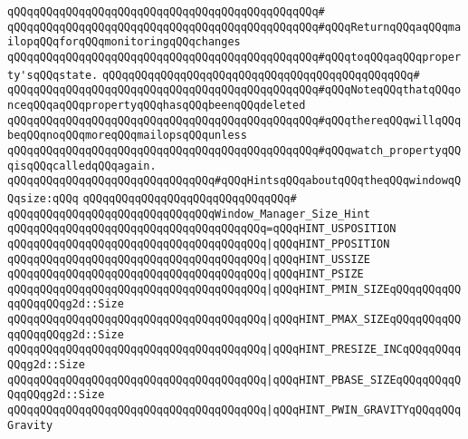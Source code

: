 \verb|qQQqqQQqqQQqqQQqqQQqqQQqqQQqqQQqqQQqqQQqqQQqqQQq#|\newline
\verb|qQQqqQQqqQQqqQQqqQQqqQQqqQQqqQQqqQQqqQQqqQQqqQQq#qQQqReturnqQQqaqQQqmailopqQQqforqQQqmonitoringqQQqchanges|\newline
\verb|qQQqqQQqqQQqqQQqqQQqqQQqqQQqqQQqqQQqqQQqqQQqqQQq#qQQqtoqQQqaqQQqproperty'sqQQqstate.|\newline
\verb|qQQqqQQqqQQqqQQqqQQqqQQqqQQqqQQqqQQqqQQqqQQqqQQq#|\newline
\verb|qQQqqQQqqQQqqQQqqQQqqQQqqQQqqQQqqQQqqQQqqQQqqQQq#qQQqNoteqQQqthatqQQqonceqQQqaqQQqpropertyqQQqhasqQQqbeenqQQqdeleted|\newline
\verb|qQQqqQQqqQQqqQQqqQQqqQQqqQQqqQQqqQQqqQQqqQQqqQQq#qQQqthereqQQqwillqQQqbeqQQqnoqQQqmoreqQQqmailopsqQQqunless|\newline
\verb|qQQqqQQqqQQqqQQqqQQqqQQqqQQqqQQqqQQqqQQqqQQqqQQq#qQQqwatch_propertyqQQqisqQQqcalledqQQqagain.|\newline
\newline
\newline
\newline
\verb|qQQqqQQqqQQqqQQqqQQqqQQqqQQqqQQq#qQQqHintsqQQqaboutqQQqtheqQQqwindowqQQqsize:qQQq|\newline
\verb|qQQqqQQqqQQqqQQqqQQqqQQqqQQqqQQq#|\newline
\verb|qQQqqQQqqQQqqQQqqQQqqQQqqQQqqQQqWindow_Manager_Size_Hint|\newline
\verb|qQQqqQQqqQQqqQQqqQQqqQQqqQQqqQQqqQQqqQQq=qQQqHINT_USPOSITION|\newline
\verb|qQQqqQQqqQQqqQQqqQQqqQQqqQQqqQQqqQQqqQQq|\verb#|qQQqHINT_PPOSITION#\newline
\verb|qQQqqQQqqQQqqQQqqQQqqQQqqQQqqQQqqQQqqQQq|\verb#|qQQqHINT_USSIZE#\newline
\verb|qQQqqQQqqQQqqQQqqQQqqQQqqQQqqQQqqQQqqQQq|\verb#|qQQqHINT_PSIZE#\newline
\verb|qQQqqQQqqQQqqQQqqQQqqQQqqQQqqQQqqQQqqQQq|\verb#|qQQqHINT_PMIN_SIZEqQQqqQQqqQQqqQQqqQQqg2d::Size#\newline
\verb|qQQqqQQqqQQqqQQqqQQqqQQqqQQqqQQqqQQqqQQq|\verb#|qQQqHINT_PMAX_SIZEqQQqqQQqqQQqqQQqqQQqg2d::Size#\newline
\verb|qQQqqQQqqQQqqQQqqQQqqQQqqQQqqQQqqQQqqQQq|\verb#|qQQqHINT_PRESIZE_INCqQQqqQQqqQQqg2d::Size#\newline
\verb|qQQqqQQqqQQqqQQqqQQqqQQqqQQqqQQqqQQqqQQq|\verb#|qQQqHINT_PBASE_SIZEqQQqqQQqqQQqqQQqg2d::Size#\newline
\verb|qQQqqQQqqQQqqQQqqQQqqQQqqQQqqQQqqQQqqQQq|\verb#|qQQqHINT_PWIN_GRAVITYqQQqqQQqGravity#\newline
